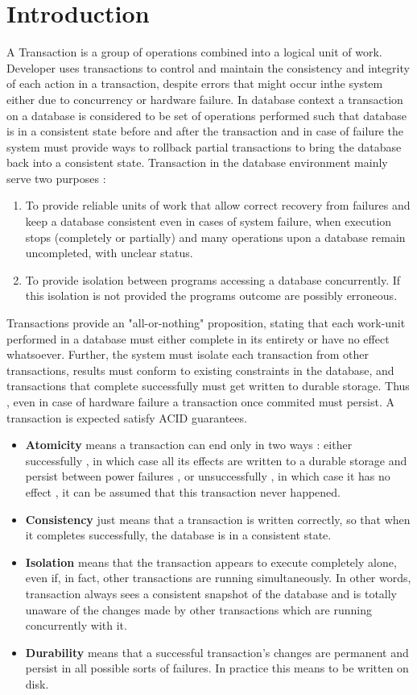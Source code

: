 \documentclass[11pt,a4paper]{article}
\begin{document}
\section{Introduction}
A Transaction is a group of operations combined into a logical unit of work. Developer uses transactions to control and maintain the consistency and integrity of each action in a transaction, despite errors that might occur inthe system either due to concurrency or hardware failure. In database context a transaction on a database is considered to be set of operations performed such that database is in a consistent state before and after the transaction and in case of failure the system must provide ways to rollback partial transactions to bring the database back into a consistent state. Transaction in the database environment mainly serve two purposes :
\begin{enumerate}
\item To provide reliable units of work that allow correct recovery from failures and keep a database consistent even in cases of system failure, when execution stops (completely or partially) and many operations upon a database remain uncompleted, with unclear status.
\item To provide isolation between programs accessing a database concurrently. If this isolation is not provided the programs outcome are possibly erroneous.
\end{enumerate}
Transactions provide an "all-or-nothing" proposition, stating that each work-unit performed in a database must either complete in its entirety or have no effect whatsoever. Further, the system must isolate each transaction from other transactions, results must conform to existing constraints in the database, and transactions that complete successfully must get written to durable storage. Thus , even in case of hardware failure a transaction once commited must persist. A transaction is expected satisfy ACID guarantees. 
\begin{itemize}


\item \textbf{Atomicity} means a transaction can end only in two ways : either successfully , in which case all its effects are written to a durable storage and persist between power failures , or unsuccessfully , in which case it has no effect , it can be assumed that this transaction never happened. 
\item \textbf{Consistency} just means that a transaction is written correctly, so that when it completes successfully, the database is in a consistent state.
\item \textbf{Isolation} means that the transaction appears to execute completely alone, even if, in fact, other transactions are running simultaneously. In other words, transaction always sees a consistent snapshot of the database and is totally unaware of the changes made by other transactions which are running concurrently with it. 
\item \textbf{Durability} means that a successful transaction's changes are permanent and persist in all possible sorts of failures. In practice this means to be written on disk. 
\end{itemize}
\end{document}
